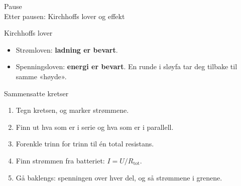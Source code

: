\documentclass[aspectratio=169, 12pt]{beamer}
\begin{document}
\begin{frame}
\begin{center}
  \Huge{Pause}\\[8pt]
  {\large Etter pausen: Kirchhoffs lover og effekt}
\end{center}
\end{frame}


\begin{frame}{Kirchhoffs lover}

  \pause
  \begin{itemize}
    \item Strømloven: \textbf{ladning er bevart}.
    \item Spenningsloven: \textbf{energi er bevart}. En runde i sløyfa tar deg tilbake til samme «høyde».
  \end{itemize}

\end{frame}

\begin{frame}{Sammensatte kretser}

  \begin{enumerate}[1.]
    \item<1-> Tegn kretsen, og marker strømmene.
    \item<2-> Finn ut hva som er i serie og hva som er i parallell.
    \item<3-> Forenkle trinn for trinn til én total resistans.
    \item<4-> Finn strømmen fra batteriet: $I = U/R_\text{tot}$.
    \item<5-> Gå baklengs: spenningen over hver del, og så strømmene i grenene.
  \end{enumerate}

\end{frame}
\end{document}
